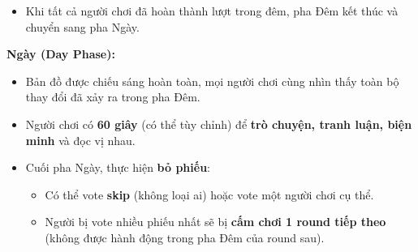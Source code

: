 \begin{enumerate}
\begin{itemize}
\begin{itemize}
\begin{enumerate}
\item Đặt thẻ đường (path card) – phải tuân thủ đầy đủ quy tắc kết nối và xoay thẻ như bản gốc.
\item Chơi thẻ hành động (action card).
\item Bỏ bài (discard).
\end{enumerate}
\item Sau khi hết thời gian hoặc xác nhận hành động, bản đồ lại tối đi với người chơi đó.
\item Bốc 1 lá bài từ chồng bài úp (nếu còn).
\end{itemize}
\item Khi tất cả người chơi đã hoàn thành lượt trong đêm, pha Đêm kết thúc và chuyển sang pha Ngày.
\end{itemize}



\textbf{Ngày (Day Phase):}
\begin{itemize}
\item Bản đồ được chiếu sáng hoàn toàn, mọi người chơi cùng nhìn thấy toàn bộ thay đổi đã xảy ra trong pha Đêm.
\item Người chơi có \textbf{60 giây} (có thể tùy chỉnh) để \textbf{trò chuyện, tranh luận, biện minh} và đọc vị nhau.
\item Cuối pha Ngày, thực hiện \textbf{bỏ phiếu}:
\begin{itemize}
\item Có thể vote \textbf{skip} (không loại ai) hoặc vote một người chơi cụ thể.
\item Người bị vote nhiều phiếu nhất sẽ bị \textbf{cấm chơi 1 round tiếp theo} (không được hành động trong pha Đêm của round sau).
\end{itemize}
\end{itemize}


\end{enumerate}
